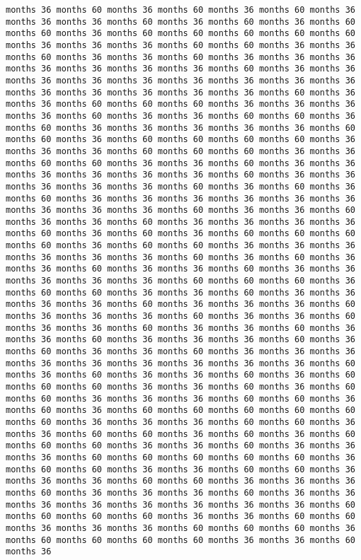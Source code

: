 \documentclass[11pt]{article}
\begin{document}
\begin{Verbatim}[commandchars=\\\{\}, frame=single, framerule=2mm, rulecolor=\color{outerrorbackground}]
months 36 months 60 months 36 months 60 months 36 months 60 months 36 months 36 months 36 months 60 months 36 months 60 months 36 months 60 months 60 months 36 months 60 months 60 months 60 months 60 months 60 months 36 months 36 months 36 months 60 months 60 months 36 months 36 months 60 months 36 months 36 months 60 months 36 months 36 months 36 months 36 months 36 months 36 months 36 months 60 months 36 months 36 months 36 months 36 months 36 months 36 months 36 months 36 months 36 months 36 months 36 months 36 months 36 months 36 months 60 months 36 months 36 months 60 months 60 months 60 months 36 months 36 months 36 months 36 months 60 months 36 months 36 months 60 months 60 months 36 months 60 months 36 months 36 months 36 months 36 months 36 months 60 months 60 months 36 months 60 months 60 months 60 months 60 months 36 months 36 months 36 months 60 months 60 months 60 months 36 months 36 months 60 months 60 months 36 months 36 months 60 months 36 months 36 months 36 months 36 months 36 months 36 months 60 months 36 months 36 months 36 months 36 months 36 months 60 months 36 months 60 months 36 months 60 months 36 months 36 months 36 months 36 months 36 months 36 months 36 months 36 months 36 months 60 months 36 months 36 months 60 months 36 months 36 months 60 months 36 months 36 months 36 months 36 months 60 months 36 months 60 months 36 months 60 months 60 months 60 months 60 months 36 months 60 months 60 months 36 months 36 months 36 months 36 months 36 months 36 months 60 months 36 months 60 months 36 months 36 months 60 months 36 months 36 months 60 months 36 months 36 months 36 months 36 months 36 months 60 months 60 months 60 months 36 months 60 months 60 months 36 months 36 months 60 months 36 months 36 months 36 months 36 months 60 months 36 months 36 months 36 months 60 months 36 months 36 months 36 months 60 months 36 months 36 months 60 months 36 months 36 months 60 months 36 months 36 months 60 months 36 months 36 months 60 months 36 months 36 months 36 months 60 months 36 months 60 months 36 months 36 months 60 months 36 months 36 months 36 months 36 months 36 months 36 months 36 months 36 months 36 months 60 months 36 months 60 months 36 months 36 months 60 months 36 months 60 months 60 months 60 months 36 months 36 months 60 months 36 months 60 months 60 months 36 months 36 months 36 months 60 months 60 months 36 months 60 months 36 months 60 months 60 months 60 months 60 months 60 months 60 months 36 months 36 months 36 months 60 months 60 months 36 months 36 months 60 months 60 months 36 months 60 months 36 months 60 months 60 months 60 months 36 months 36 months 60 months 36 months 36 months 36 months 60 months 60 months 60 months 60 months 60 months 36 months 60 months 60 months 36 months 36 months 60 months 60 months 36 months 36 months 36 months 60 months 60 months 36 months 36 months 36 months 60 months 36 months 36 months 36 months 60 months 36 months 36 months 36 months 36 months 36 months 36 months 36 months 36 months 60 months 60 months 60 months 60 months 36 months 36 months 60 months 60 months 36 months 36 months 36 months 60 months 60 months 60 months 36 months 60 months 60 months 60 months 60 months 36 months 36 months 60 months 36 
\end{Verbatim}
\end{document}
